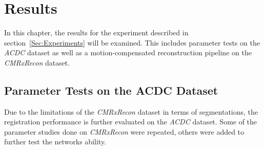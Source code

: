
\chapter{Results} \label{Ch:Results}
In this chapter, the results for the experiment described in section~\ref{Sec:Experiments} will be examined. This includes parameter tests on the \emph{ACDC} dataset as well as a motion-compensated reconstruction pipeline on the \emph{CMRxRecon} dataset.
 
\section{Parameter Tests on the ACDC Dataset} \label{Sec:ResultsParameterTestsACDC}
Due to the limitations of the \emph{CMRxRecon} dataset in terms of segmentations, the registration performance is further evaluated on the \emph{ACDC} dataset. Some of the parameter studies done on \emph{CMRxRecon} were repeated, others were added to further test the networks ability.

